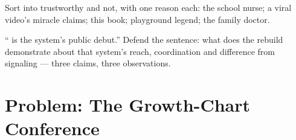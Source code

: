 \begin{exercise}[$\star\star$]\label{exo:g8:puberty:11}
Sort into trustworthy and not, with one reason each:
the school nurse; a viral video's miracle claims; this
book; playground legend; the family doctor.
\end{exercise}

\begin{exercise}[$\star\star\star$]\label{exo:g8:puberty:12}
`` is the  system's public debut.''
Defend the sentence: what does the rebuild demonstrate
about that system's reach, coordination and difference
from  signaling --- three claims, three
observations.
\end{exercise}

\section{Problem: The Growth-Chart Conference}

